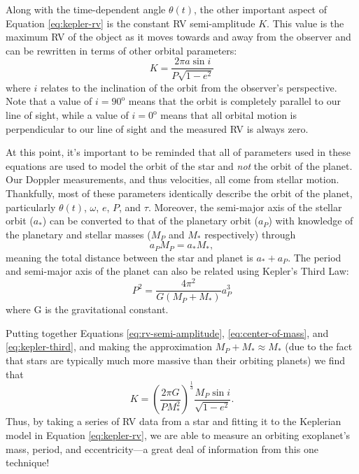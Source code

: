 Along with the time-dependent angle $\theta(t)$, the other important aspect of Equation \ref{eq:kepler-rv} is the constant RV semi-amplitude $K$. This value is the maximum RV of the object as it moves towards and away from the observer and can be rewritten in terms of other orbital parameters:
\begin{equation}
    K = \frac{2\pi a \sin{i}}{P\sqrt{1-e^2}}
    \label{eq:rv-semi-amplitude}
\end{equation}
where $i$ relates to the inclination of the orbit from the observer's perspective. Note that a value of $i=90^\mathrm{o}$ means that the orbit is completely parallel to our line of sight, while a value of $i=0^\mathrm{o}$ means that all orbital motion is perpendicular to our line of sight and the measured RV is always zero.

At this point, it's important to be reminded that all of parameters used in these equations are used to model the orbit of the star and \textit{not} the orbit of the planet. Our Doppler measurements, and thus velocities, all come from stellar motion. Thankfully, most of these parameters identically describe the orbit of the planet, particularly $\theta(t)$, $\omega$, $e$, $P$, and $\tau$. Moreover, the semi-major axis of the stellar orbit ($a_*$) can be converted to that of the planetary orbit ($a_P$) with knowledge of the planetary and stellar masses ($M_P$ and $M_*$ respectively) through
\begin{equation}
    a_P M_P = a_* M_*,
    \label{eq:center-of-mass}
\end{equation}
meaning the total distance between the star and planet is $a_* + a_P$. The period and semi-major axis of the planet can also be related using Kepler's Third Law:
\begin{equation}
    P^2 = \frac{4\pi^2}{G (M_P+M_*)} a_P^3
    \label{eq:kepler-third}
\end{equation}
where G is the gravitational constant.

Putting together Equations \ref{eq:rv-semi-amplitude}, \ref{eq:center-of-mass}, and \ref{eq:kepler-third}, and making the approximation $M_P + M_* \approx M_*$ (due to the fact that stars are typically much more massive than their orbiting planets) we find that 
\begin{equation}
    K = \left( \frac{2\pi G}{P M_*^2} \right)^\frac{1}{3} \frac{M_P \sin{i}}{\sqrt{1-e^2}}.
    \label{eq:rv-semi-amplitude2}
\end{equation}
Thus, by taking a series of RV data from a star and fitting it to the Keplerian model in Equation \ref{eq:kepler-rv}, we are able to measure an orbiting exoplanet's mass, period, and eccentricity---a great deal of information from this one technique!

